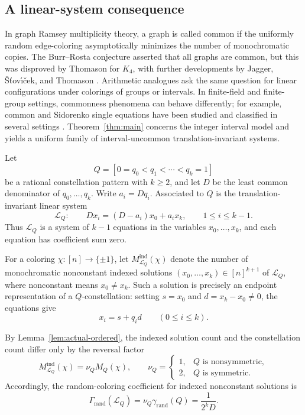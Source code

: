 \documentclass[twoside,12pt]{article}
\newcommand{\rand}{\mathrm{rand}}
\newcommand{\1}{\mathbf 1}
\begin{document}
\subsection{A linear-system consequence}
\label{subsec:linear-system}

In graph Ramsey multiplicity theory, a graph is called common if the uniformly
random edge-coloring asymptotically minimizes the number of monochromatic
copies.  The Burr--Rosta conjecture asserted that all graphs are common, but
this was disproved by Thomason for \(K_4\), with further developments by
Jagger, \v{S}\v{t}ov\'\i\v{c}ek, and Thomason \cite{BR80,Th89,JST96}.
Arithmetic analogues ask the same question for linear configurations under
colorings of groups or intervals.  In finite-field and finite-group settings,
commonness phenomena can behave differently; for example, common and Sidorenko
single equations have been studied and classified in several settings
\cite{SW17,FPZ21,Ver23}.  Theorem~\ref{thm:main} concerns the integer interval
model and yields a uniform family of interval-uncommon translation-invariant
systems.

Let
\[
Q=[0=q_0<q_1<\cdots<q_k=1]
\]
be a rational constellation pattern with \(k\ge2\), and let \(D\) be the least
common denominator of \(q_0,\dots,q_k\).  Write \(a_i=Dq_i\).  Associated to
\(Q\) is the translation-invariant linear system
\[
\mathcal L_Q:\qquad
D x_i=(D-a_i)x_0+a_i x_k,
\qquad 1\le i\le k-1.
\]
Thus \(\mathcal L_Q\) is a system of \(k-1\) equations in the variables
\(x_0,\dots,x_k\), and each equation has coefficient sum zero.

For a coloring \(\chi:[n]\to\{\pm1\}\), let
\(M_{\mathcal L_Q}^{\mathrm{ind}}(\chi)\) denote the number of monochromatic
nonconstant indexed solutions \((x_0,\dots,x_k)\in[n]^{k+1}\) of
\(\mathcal L_Q\), where nonconstant means \(x_0\ne x_k\).  Such a solution is
precisely an endpoint representation of a \(Q\)-constellation: setting
\(s=x_0\) and \(d=x_k-x_0\ne0\), the equations give
\[
x_i=s+q_i d
\qquad (0\le i\le k).
\]

By Lemma~\ref{lem:actual-ordered}, the indexed solution count and the
constellation count differ only by the reversal factor
\[
M_{\mathcal L_Q}^{\mathrm{ind}}(\chi)
=
\nu_Q M_Q(\chi),
\qquad
\nu_Q=
\begin{cases}
1, & Q\text{ is nonsymmetric},\\
2, & Q\text{ is symmetric}.
\end{cases}
\]
Accordingly, the random-coloring coefficient for indexed nonconstant solutions
is
\[
\Gamma_{\rand}(\mathcal L_Q)
=
\nu_Q\gamma_{\rand}(Q)
=
\frac{1}{2^kD}.
\]
\end{document}
